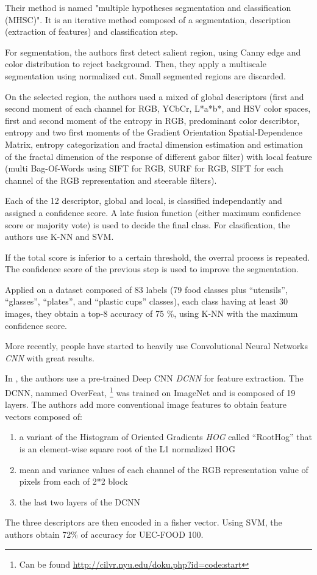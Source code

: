 Their method is named "multiple hypotheses segmentation and classification (MHSC)". It is an iterative method composed of a segmentation, description (extraction of features) and classification step.

For segmentation, the authors first detect salient region, using Canny edge and color distribution to reject background. Then, they apply a multiscale segmentation using normalized cut. Small segmented regions are discarded.

On the selected region, the authors used a mixed of global descriptors (first and second moment of each channel for RGB, YCbCr, L*a*b*, and HSV color spaces, first and second moment of the entropy in RGB, predominant color describtor, entropy and two first moments of the Gradient Orientation Spatial-Dependence Matrix, entropy categorization and fractal dimension estimation and estimation of the fractal dimension of the response of different gabor filter) with local feature (multi Bag-Of-Words using SIFT for RGB, SURF for RGB, SIFT for each channel of the RGB representation and steerable filters).

Each of the 12 descriptor, global and local, is classified independantly and assigned a confidence score. A late fusion function (either maximum confidence score or majority vote) is used  to decide the final class. For clasification, the authors use K-NN and SVM.

If the total score is inferior to a certain threshold, the overral process is repeated. The confidence score of the previous step is used to improve the segmentation.

Applied on a dataset composed of 83 labels (79 food classes plus \enquote{utensils}, \enquote{glasses}, \enquote{plates}, and \enquote{plastic cups} classes), each class having at least 30 images, they obtain a top-8 accuracy of 75 \%, using K-NN with the maximum confidence score.


More recently, people have started to heavily use Convolutional Neural Networks \textit{CNN} with great results.

In \cite{Kawano2014}, the authors use a pre-trained Deep CNN \textit{DCNN} for feature extraction. The DCNN, nammed OverFeat, \footnote{Can be found \url{http://cilvr.nyu.edu/doku.php?id=code:start}} was trained on ImageNet and is composed of 19 layers. The authors add more conventional image features to obtain feature vectors composed of: 
\begin{enumerate}
    \item a variant of the Histogram of Oriented Gradients \textit{HOG} called \enquote{RootHog} that is an element-wise square root of the L1 normalized HOG
    \item mean and variance values of each channel of the RGB representation value of pixels from each of 2*2  block
    \item the last two layers of the DCNN
\end{enumerate}
The three descriptors are then encoded in a fisher vector. Using SVM, the authors obtain 72\% of accuracy for UEC-FOOD 100.

